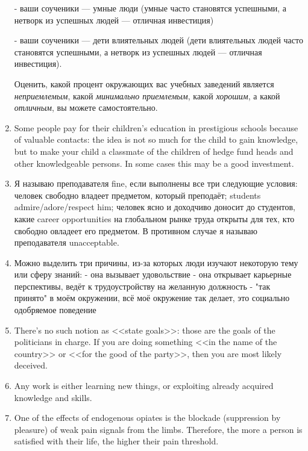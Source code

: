 \documentclass[11pt]{article}
\theoremstyle{remark}
\theoremstyle{definition}
\begin{document}
\begin{enumerate}
- ваши соученики --- умные люди (умные часто становятся успешными, а нетворк из успешных людей --- отличная инвестиция)

- ваши соученики --- дети влиятельных людей (дети влиятельных людей часто становятся успешными, а нетворк из успешных людей --- отличная инвестиция).


Оценить, какой процент окружающих вас учебных заведений является \textit{неприемлемым}, какой \textit{минимально приемлемым}, какой \textit{хорошим}, а какой \textit{отличным}, вы можете самостоятельно. 




\item Some people pay for their children's education in prestigious schools because of valuable contacts: the idea is not so much for the child to gain knowledge, but to make your child a classmate of the children of hedge fund heads and other knowledgeable persons. In some cases this may be a good investment.



\item Я называю преподавателя fine, если выполнены все три следующие условия: человек свободно владеет предметом, который преподаёт; students admire/adore/respect him; человек ясно и доходчиво доносит до студентов, какие career opportunities на глобальном рынке труда открыты для тех, кто свободно овладеет его предметом. В противном случае я называю преподавателя unacceptable.



\item Можно выделить три причины, из-за которых люди изучают некоторую тему или сферу знаний:
- она вызывает удовольствие
- она открывает карьерные перспективы, ведёт к трудоустройству на желанную должность
- "так принято" в моём окружении, всё моё окружение так делает, это социально одобряемое поведение




\item There's no such notion as <<state goals>>: those are the goals of the politicians in charge. If you are doing something <<in the name of the country>> or <<for the good of the party>>, then you are most likely deceived. 


\item Any work is either learning new things, or exploiting already acquired knowledge and skills.

\item One of the effects of endogenous opiates is the blockade (suppression by pleasure) of weak pain signals from the limbs. Therefore, the more a person is satisfied with their life, the higher their pain threshold.



\end{enumerate}
\end{document}
